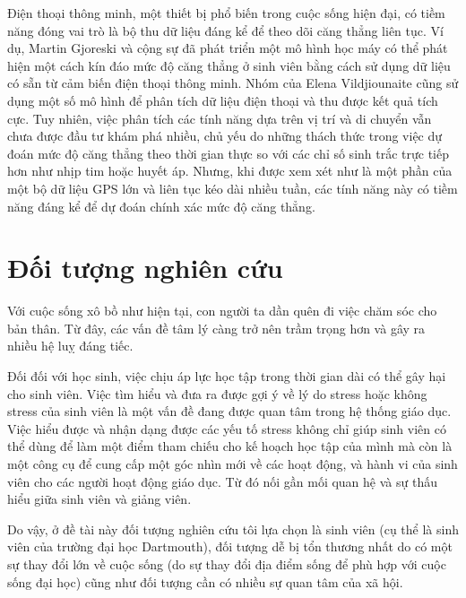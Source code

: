 Điện thoại thông minh, một thiết bị phổ biến trong cuộc sống hiện đại, có tiềm năng đóng vai trò là bộ thu dữ liệu đáng kể để theo dõi căng thẳng liên tục. Ví dụ, Martin Gjoreski và cộng sự đã phát triển một mô hình học máy có thể phát hiện một cách kín đáo mức độ căng thẳng ở sinh viên bằng cách sử dụng dữ liệu có sẵn từ cảm biến điện thoại thông minh\cite{d}. Nhóm của Elena Vildjiounaite cũng sử dụng một số mô hình để phân tích dữ liệu điện thoại và thu được kết quả tích cực\cite{e}. Tuy nhiên, việc phân tích các tính năng dựa trên vị trí và di chuyển vẫn chưa được đầu tư khám phá nhiều, chủ yếu do những thách thức trong việc dự đoán mức độ căng thẳng theo thời gian thực so với các chỉ số sinh trắc trực tiếp hơn như nhịp tim hoặc huyết áp. Nhưng, khi được xem xét như là một phần của một bộ dữ liệu GPS lớn và liên tục kéo dài nhiều tuần, các tính năng này có tiềm năng đáng kể để dự đoán chính xác mức độ căng thẳng.
 \section{Đối tượng nghiên cứu}
 Với cuộc sống xô bồ như hiện tại, con người ta dần quên đi việc chăm sóc cho bản thân. Từ đây, các vấn đề tâm lý càng trở nên trầm trọng hơn và gây ra nhiều hệ luỵ đáng tiếc. 

 Đối đối với học sinh, việc chịu áp lực học tập trong thời gian dài có thể gây hại cho sinh viên. Việc tìm hiểu và đưa ra được gợi ý về lý do stress hoặc không stress của sinh viên là một vấn đề đang được quan tâm trong hệ thống giáo dục. Việc hiểu được và nhận dạng được các yếu tố stress không chỉ giúp sinh viên có thể dùng để làm một điểm tham chiếu cho kế hoạch học tập của mình mà còn là một công cụ để cung cấp một góc nhìn mới về các hoạt động, và hành vi của sinh viên cho các người hoạt động giáo dục. Từ đó nối gần mối quan hệ và sự thấu hiểu giữa sinh viên và giảng viên.


  Do vậy, ở đề tài này đối tượng nghiên cứu tôi lựa chọn là sinh viên (cụ thể là sinh viên của trường đại học Dartmouth), đối tượng dễ bị tổn thương nhất do có một sự thay đổi lớn về cuộc sống (do sự thay đổi địa điểm sống để phù hợp với cuộc sống đại học) cũng như đối tượng cần có nhiều sự quan tâm của xã hội. 
